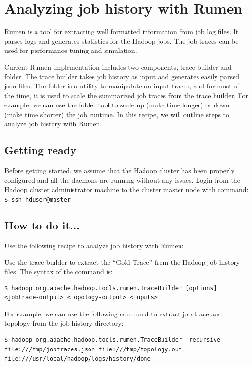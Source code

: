 \section{Analyzing job history with Rumen}
Rumen is a tool for extracting well formatted information from job log files. It parses logs and generates statistics for the Hadoop jobs. The job traces can be used for performance tuning and simulation.

Current Rumen implementation includes two components, trace builder and folder. The trace builder takes job history as input and generates easily parsed json files. The folder is a utility to manipulate on input traces, and for most of the time, it is used to scale the summarized job traces from the trace builder. For example, we can use the folder tool to scale up (make time longer) or down (make time shorter) the job runtime. In this recipe, we will outline steps to analyze job history with Rumen.

\subsection*{Getting ready}
Before getting started, we assume that the Hadoop cluster has been properly configured and all the daemons are running without any issues.
Login from the Hadoop cluster administrator machine to the cluster master node with command: \\
\verb|$ ssh hduser@master|

\subsection*{How to do it...}
Use the following recipe to analyze job history with Rumen:

Use the trace builder to extract the ``Gold Trace'' from the Hadoop job history files. The syntax of the command is:
\lstset{style=bashstyle}
\begin{lstlisting}
$ hadoop org.apache.hadoop.tools.rumen.TraceBuilder [options] <jobtrace-output> <topology-output> <inputs>
\end{lstlisting}

For example, we can use the following command to extract job trace and topology from the job history directory:
\lstset{style=bashstyle}
\begin{lstlisting}$ hadoop org.apache.hadoop.tools.rumen.TraceBuilder -recursive file:///tmp/jobtraces.json file:///tmp/topology.out file:///usr/local/hadoop/logs/history/done
\end{lstlisting}

